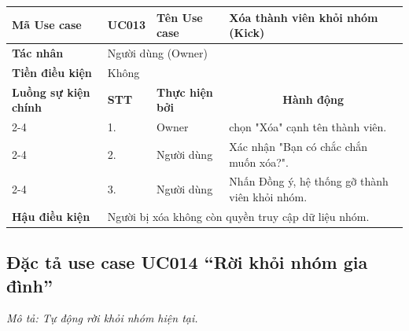 \documentclass[../main.tex]{subfiles}
\begin{document}
\begingroup
\renewcommand{\arraystretch}{1.5}

\begin{longtable}{|p{2.7cm}|p{0.8cm}|p{2.6cm}|p{7.3cm}|}
\hline
\cellcolor[HTML]{D5F5E3}\textbf{Mã Use case} & \multicolumn{1}{l|}{UC013} & \cellcolor[HTML]{D5F5E3}\textbf{Tên Use case} & Xóa thành viên khỏi nhóm (Kick) \\ \hline
\cellcolor[HTML]{D5F5E3}\textbf{Tác nhân} & \multicolumn{3}{p{10.7cm}|}{Người dùng (Owner)} \\ \hline
\cellcolor[HTML]{D5F5E3}\textbf{Tiền điều kiện} & \multicolumn{3}{p{10.7cm}|}{Không} \\ \hline

\cellcolor[HTML]{D5F5E3}\textbf{Luồng sự kiện chính} & \cellcolor[HTML]{FDEBD0}\textbf{STT} & \cellcolor[HTML]{FDEBD0}\textbf{Thực hiện bởi} & \multicolumn{1}{c|}{\cellcolor[HTML]{FDEBD0}\textbf{Hành động}} \\ \cline{2-4} 
\cellcolor[HTML]{D5F5E3} & 1. & Owner & chọn "Xóa" cạnh tên thành viên. \\ \cline{2-4} 
\cellcolor[HTML]{D5F5E3} & 2. & Người dùng & Xác nhận "Bạn có chắc chắn muốn xóa?". \\ \cline{2-4} 
\cellcolor[HTML]{D5F5E3} & 3. & Người dùng & Nhấn Đồng ý, hệ thống gỡ thành viên khỏi nhóm. \\ \hline

\cellcolor[HTML]{D5F5E3}\textbf{Hậu điều kiện} & \multicolumn{3}{p{10.7cm}|}{Người bị xóa không còn quyền truy cập dữ liệu nhóm.} \\ \hline
\end{longtable}
\endgroup

\subsection{Đặc tả use case UC014 ``Rời khỏi nhóm gia đình''}
\textit{Mô tả: Tự động rời khỏi nhóm hiện tại.}
\vspace{0.5cm}

\begingroup
\renewcommand{\arraystretch}{1.5}
\end{document}
